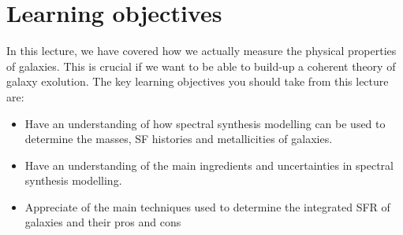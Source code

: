 \documentclass[11pt]{article}
\begin{document}
\section{Learning objectives}
In this lecture, we have covered how we actually measure the physical
properties of galaxies. This is crucial if we want to be able to
build-up a coherent theory of galaxy exolution. The key learning
objectives you should take from this lecture are:
\begin{itemize}
\item Have an understanding of how spectral synthesis modelling can be
  used to determine the masses, SF histories and metallicities of
  galaxies.
\item Have an understanding of the main ingredients and uncertainties
  in spectral synthesis modelling.  
\item Appreciate of the main techniques used to determine the
  integrated SFR of galaxies and their pros and cons
\end{itemize}
\end{document}

